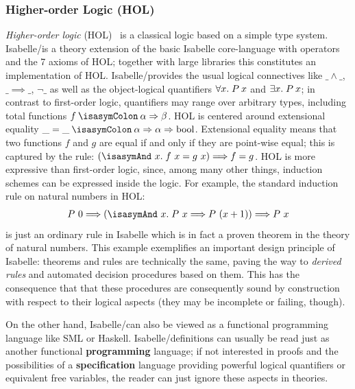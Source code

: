 \subsubsection{Higher-order Logic (HOL)}
\emph{Higher-order logic}
(HOL)~\cite{church:types:1940,andrews:introduction:2002} is a
classical logic based on a simple type system. Isabelle/\HOL is
a theory extension of the basic Isabelle core-language with
operators and the 7 axioms of HOL; together with large libraries
this constitutes an implementation of HOL. 
Isabelle/\HOL provides the usual
logical connectives like $\_ \land \_$, $\_ \implies\_$, $\lnot \_ $
as well as the object-logical quantifiers $\forall x.\; P\: x$ and
$\exists x.\; P\: x$; in contrast to first-order logic, quantifiers
may range over arbitrary types, including total functions
$f\ofType\alpha \Rightarrow \beta$. HOL is centered around
extensional equality $\_ = \_ \ofType \alpha \Rightarrow \alpha
\Rightarrow \text{bool}$. Extensional equality means that two functions $f$ and $g$
are equal if and only if they are point-wise equal; this is captured by the rule:
$(\Forall~x\spot f~x = g~x) \Longrightarrow f = g$.
HOL is more expressive than first-order
logic, since, among many other things, induction schemes can be expressed inside the
logic. For example, the standard induction rule on natural numbers in HOL:
\begin{gather*}
  P~0 \Longrightarrow (\Forall~x\spot P~x \Longrightarrow P~(x+1)) \Longrightarrow P~x
\end{gather*}
is just an ordinary rule in Isabelle which is in fact a proven theorem
in the theory of natural numbers. This example exemplifies an important
design principle of Isabelle: theorems and rules are technically the
same, paving the way to \emph{derived rules} and automated 
decision procedures based on them. This has the consequence that
that these procedures are consequently sound by construction
with respect to their logical aspects (they may be incomplete
or failing, though).

On the other hand, Isabelle/\HOL can also be viewed as a functional programming language
like SML or Haskell. Isabelle/\HOL definitions can usually be 
read just as another functional \textbf{programming} language;
if not interested in proofs and the possibilities of a 
\textbf{specification} language providing
powerful logical quantifiers or equivalent free variables, 
the reader can just ignore these aspects in theories.


